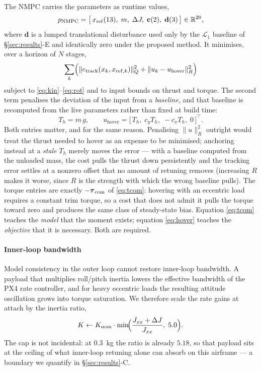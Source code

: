 The NMPC carries the parameters as runtime values,
\begin{equation}
p_{\mathrm{NMPC}} = \bigl[\, x_{\mathrm{ref}}(13),\; m,\; \Delta J,\; \mathbf{c}(2),\; \mathbf{d}(3) \,\bigr] \in \mathbb{R}^{20},
\label{eq:pnmpc}
\end{equation}
where $\mathbf{d}$ is a lumped translational disturbance used only by the
$\mathcal{L}_1$ baseline of \S\ref{sec:results}-E and identically zero
under the proposed method. It minimises, over a horizon of $N$ stages,
\begin{equation}
\sum_{k} \Bigl( \| e_{\mathrm{track}}(x_k, x_{\mathrm{ref},k}) \|^2_{Q}
+ \| u_k - u_{\mathrm{hover}} \|^2_{R} \Bigr)
\label{eq:nmpc}
\end{equation}
subject to \eqref{eq:kin}--\eqref{eq:rot} and to input bounds on thrust and
torque. The second term penalises the deviation of the input from a
\emph{baseline}, and that baseline is recomputed from the live parameters
rather than fixed at build time:
\begin{equation}
T_h = m\,g, \qquad
u_{\mathrm{hover}} = \bigl[\, T_h,\; c_y T_h,\; -c_x T_h,\; 0 \,\bigr]^{\!\top}.
\label{eq:hover}
\end{equation}
Both entries matter, and for the same reason. Penalising $\|u\|^2_R$
outright would treat the thrust needed to hover as an expense to be
minimised; anchoring instead at a \emph{stale} $T_h$ merely moves the
error --- with a baseline computed from the unloaded mass, the cost pulls
the thrust down persistently and the tracking error settles at a nonzero
offset that no amount of retuning removes (increasing $R$ makes it worse,
since $R$ is the strength with which the wrong baseline pulls). The torque
entries are exactly $-\boldsymbol{\tau}_{\mathrm{com}}$ of \eqref{eq:tcom}: hovering with an eccentric
load requires a constant trim torque, so a cost that does not admit it
pulls the torque toward zero and produces the same class of steady-state
bias. Equation \eqref{eq:tcom} teaches the \emph{model} that the moment
exists; equation \eqref{eq:hover} teaches the \emph{objective} that it is
necessary. Both are required.

\paragraph{Inner-loop bandwidth} Model consistency in the outer loop
cannot restore inner-loop bandwidth. A payload that multiplies roll/pitch
inertia lowers the effective bandwidth of the PX4 rate controller, and for
heavy eccentric loads the resulting attitude oscillation grows into torque
saturation. We therefore scale the rate gains at attach by the inertia
ratio,
\begin{equation}
K \leftarrow K_{\mathrm{nom}} \cdot \min\!\Bigl( \frac{J_{xx} + \Delta J}{J_{xx}},\; 5.0 \Bigr).
\label{eq:gain}
\end{equation}
The cap is not incidental: at \SI{0.3}{\kg} the ratio is already $5.18$,
so that payload sits at the ceiling of what inner-loop retuning alone can
absorb on this airframe --- a boundary we quantify in
\S\ref{sec:results}-C.

